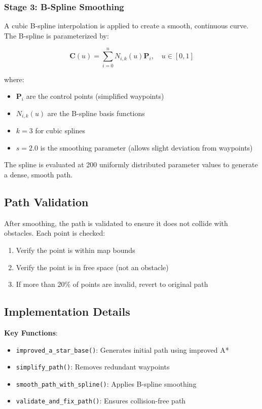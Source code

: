 \documentclass[aps,letterpaper,10pt]{revtex4}
\begin{document}
\subsubsection{Stage 3: B-Spline Smoothing}

A cubic B-spline interpolation is applied to create a smooth, continuous curve. The B-spline is parameterized by:

\begin{equation}
\mathbf{C}(u) = \sum_{i=0}^{n} N_{i,k}(u) \mathbf{P}_i, \quad u \in [0, 1]
\end{equation}

where:
\begin{itemize}
    \item $\mathbf{P}_i$ are the control points (simplified waypoints)
    \item $N_{i,k}(u)$ are the B-spline basis functions
    \item $k = 3$ for cubic splines
    \item $s = 2.0$ is the smoothing parameter (allows slight deviation from waypoints)
\end{itemize}

The spline is evaluated at 200 uniformly distributed parameter values to generate a dense, smooth path.

\subsection{Path Validation}

After smoothing, the path is validated to ensure it does not collide with obstacles. Each point is checked:

\begin{enumerate}
    \item Verify the point is within map bounds
    \item Verify the point is in free space (not an obstacle)
    \item If more than 20\% of points are invalid, revert to original path
\end{enumerate}

\subsection{Implementation Details}

\textbf{Key Functions}:
\begin{itemize}
    \item \texttt{improved\_a\_star\_base()}: Generates initial path using improved A*
    \item \texttt{simplify\_path()}: Removes redundant waypoints
    \item \texttt{smooth\_path\_with\_spline()}: Applies B-spline smoothing
    \item \texttt{validate\_and\_fix\_path()}: Ensures collision-free path
\end{itemize}
\end{document}

